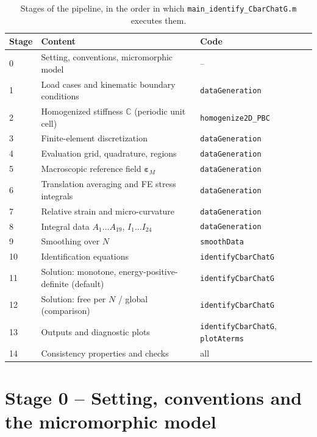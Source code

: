\documentclass[11pt,a4paper]{article}
\newcommand{\C}{\mathbb{C}}                     %
\newcommand{\epsM}{\bm{\varepsilon}_{M}}
\newcommand{\code}[1]{\texttt{#1}}
\theoremstyle{plain}
\theoremstyle{remark}
\begin{document}
\begin{table}[h]
\centering\small
\begin{tabular}{@{}lll@{}}
\toprule
Stage & Content & Code\\
\midrule
0 & Setting, conventions, micromorphic model & --\\
1 & Load cases and kinematic boundary conditions & \code{dataGeneration}\\
2 & Homogenized stiffness $\C$ (periodic unit cell) & \code{homogenize2D\_PBC}\\
3 & Finite-element discretization & \code{dataGeneration}\\
4 & Evaluation grid, quadrature, regions & \code{dataGeneration}\\
5 & Macroscopic reference field $\epsM$ & \code{dataGeneration}\\
6 & Translation averaging and FE stress integrals & \code{dataGeneration}\\
7 & Relative strain and micro-curvature & \code{dataGeneration}\\
8 & Integral data $A_1\dots A_{19}$, $I_1\dots I_{24}$ & \code{dataGeneration}\\
9 & Smoothing over $N$ & \code{smoothData}\\
10 & Identification equations & \code{identifyCbarChatG}\\
11 & Solution: monotone, energy-positive-definite (default) & \code{identifyCbarChatG}\\
12 & Solution: free per $N$ / global (comparison) & \code{identifyCbarChatG}\\
13 & Outputs and diagnostic plots & \code{identifyCbarChatG}, \code{plotAterms}\\
14 & Consistency properties and checks & all\\
\bottomrule
\end{tabular}
\caption{Stages of the pipeline, in the order in which \code{main\_identify\_CbarChatG.m} executes them.}
\end{table}

\section{Stage 0 -- Setting, conventions and the micromorphic model}
\label{sec:stage0}
\end{document}
